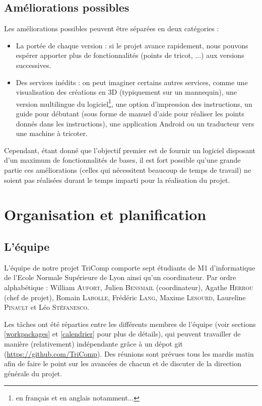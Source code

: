 \documentclass{article}
\begin{document}
\subsection{Améliorations possibles}

Les améliorations possibles peuvent être séparées en deux catégories :
\begin{itemize}
   \item La portée de chaque version : si le projet avance rapidement, nous pouvons espérer apporter plus de fonctionnalités (points
de tricot, ...) aux versions successives.
   \item Des services inédits : on peut imaginer certains autres services, comme une visualisation des créations
en 3D (typiquement sur un mannequin), une version multilingue du logiciel\footnote{en français et en anglais notamment...}, une option
d'impression des instructions, un guide pour débutant (sous forme de manuel d'aide pour réaliser les points donnés dans les instructions),
une application Android ou un traducteur vers une machine à tricoter.
\end{itemize}
Cependant, étant donné que l'objectif premier est de fournir un logiciel disposant d'un maximum de fonctionnalités de bases, il est fort
possible qu'une grande partie ces améliorations (celles qui nécessitent beaucoup de temps de travail) ne soient pas réalisées durant le
temps imparti pour la réalisation du projet.


\section{Organisation et planification}

\subsection{L'équipe}

L'équipe de notre projet TriComp comporte sept étudiants de M1 d'informatique de l'Ecole Normale Supérieure de Lyon ainsi qu'un coordinateur. Par ordre alphabétique : William \textsc{Aufort},
Julien \textsc{Bensmail} (coordinateur), Agathe \textsc{Herrou} (chef de projet), Romain \textsc{Labolle}, Frédéric \textsc{Lang}, Maxime
\textsc{Lesourd}, Laureline \textsc{Pinault} et Léo \textsc{Stéfanesco}. \newline

Les tâches ont été réparties entre les différents membres de l'équipe (voir sections \ref{workpackages} et \ref{calendrier} pour plus de détails), qui peuvent travailler de manière (relativement) indépendante grâce à un dépot git (\url{https://github.com/TriComp}). Des réunions sont prévues tous les mardis matin afin de faire le point sur les avancées de chacun et de discuter de la direction générale du projet.
\end{document}
